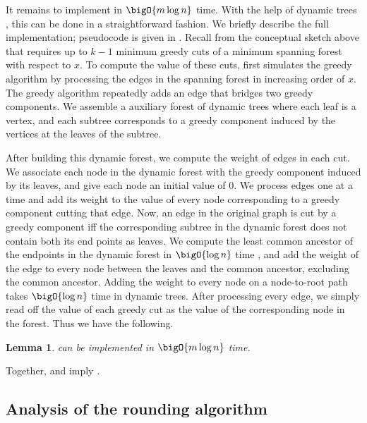 \documentclass[11pt]{article}
\numberwithin{equation}{section}
\newtheorem{lemma}[theorem]{Lemma}
\theoremstyle{definition}
\theoremstyle{plain}
\newcommand{\wrt}{with respect to\xspace} %
\begin{document}
%

It remains to implement  in $\bigO{m \log n}$
time. With the help of dynamic trees \cite{st-83}, this can be done
in a straightforward fashion. We briefly describe the full
implementation; pseudocode is given in . Recall
from the conceptual sketch above that  requires up
to $k-1$ minimum greedy cuts of a minimum spanning forest \wrt
$x$. To compute the value of these cuts,  first
simulates the greedy algorithm by processing the edges in the spanning
forest in increasing order of $x$. The greedy algorithm repeatedly
adds an edge that bridges two greedy components. We assemble a
auxiliary forest of dynamic trees where each leaf is a vertex, and
each subtree corresponds to a greedy component induced by the vertices
at the leaves of the subtree.

After building this dynamic forest, we compute the weight of edges in
each cut. We associate each node in the dynamic forest with the greedy
component induced by its leaves, and give each node an initial value
of 0. We process edges one at a time and add its weight to the value
of every node corresponding to a greedy component cutting that edge.
Now, an edge in the original graph is cut by a greedy component iff
the corresponding subtree in the dynamic forest does not contain both
its end points as leaves. We compute the least common ancestor of the
endpoints in the dynamic forest in $\bigO{\log n}$ time \cite{ht-84},
and add the weight of the edge to every node between the leaves and
the common ancestor, excluding the common ancestor. Adding the weight
to every node on a node-to-root path takes $\bigO{\log n}$ time
\cite{st-83} in dynamic trees. After processing every edge, we simply
read off the value of each greedy cut as the value of the
corresponding node in the forest. Thus we have the following.
\begin{lemma}
    can be implemented
  in $\bigO{m \log n}$ time.
\end{lemma}
Together,  and 
imply .


\subsection{Analysis of the rounding algorithm}


\providecommand{\cuts}{\mathcal{C}}
\end{document}
